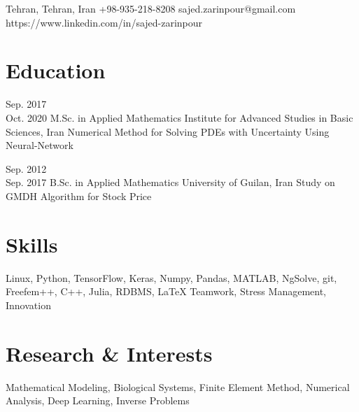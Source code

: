 \documentclass[10pt, a4paper]{article}
\begin{document}
	\contactInfo
	{Tehran, Tehran, Iran}
	{ +98-935-218-8208 }
	{sajed.zarinpour@gmail.com}
	{https://www.linkedin.com/in/sajed-zarinpour}

	\section*{Education} 
		\eduEntry
		{{Sep. 2017\\Oct. 2020} \hspace{.5em}\normalsize}
		{M.Sc. in Applied Mathematics}
		{Institute for Advanced Studies in Basic Sciences, Iran}
		{Numerical Method for Solving PDEs with Uncertainty Using Neural-Network}
		{ 
		}
		
		\eduEntry
		{\small{Sep. 2012\\Sep. 2017}\hspace{.5cm}}
		{B.Sc. in Applied Mathematics}
		{University of Guilan, Iran}
		{Study on GMDH Algorithm for Stock Price}
		{ 
		}
	
	\section*{Skills}	
	\aside
	{
	}
	{
		\skills
		{
			Linux,
			Python,
			TensorFlow,
			Keras,
			Numpy,
			Pandas,
			MATLAB,
			NgSolve,
			git,
			Freefem++,
			C++,
			Julia,
			RDBMS,
			LaTeX
		}
	}
	\aside
	{
	}
	{
		\skills
		{
			Teamwork,
			Stress Management,
			Innovation
		}
	}
	
	\section*{Research \& Interests}
	\interestslist
	{
		Mathematical Modeling,
		Biological Systems,
		Finite Element Method, 
		Numerical Analysis,
		Deep Learning,
		Inverse Problems
	}
\end{document}
